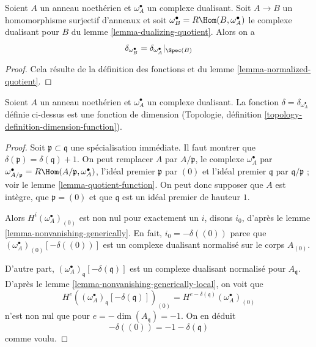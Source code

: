\begin{lemma}
\label{lemma-quotient-function}
Soient $A$ un anneau noethérien et $\omega_A^\bullet$ un complexe dualisant.
Soit $A \to B$ un homomorphisme surjectif d'anneaux et soit $\omega_B^\bullet = R\Hom(B, \omega_A^\bullet)$
le complexe dualisant pour $B$ du lemme \ref{lemma-dualizing-quotient}. Alors on a
$$
\delta_{\omega_B^\bullet} = \delta_{\omega_A^\bullet}|_{\Spec(B)}
$$
\end{lemma}

\begin{proof}
Cela résulte de la définition des fonctions et du lemme \ref{lemma-normalized-quotient}.
\end{proof}

\begin{lemma}
\label{lemma-dimension-function}
Soient $A$ un anneau noethérien et $\omega_A^\bullet$ un complexe dualisant.
La fonction $\delta = \delta_{\omega_A^\bullet}$ définie ci-dessus est une fonction de dimension
(Topologie, définition \ref{topology-definition-dimension-function}).
\end{lemma}

\begin{proof}
Soit $\mathfrak p \subset \mathfrak q$ une spécialisation immédiate. Il faut montrer que $\delta(\mathfrak p) = \delta(\mathfrak q) + 1$.
On peut remplacer $A$ par $A/\mathfrak p$, le complexe $\omega_A^\bullet$ par $\omega_{A/\mathfrak p}^\bullet = R\Hom(A/\mathfrak p, \omega_A^\bullet)$,
l'idéal premier $\mathfrak p$ par $(0)$ et l'idéal premier $\mathfrak q$ par $\mathfrak q/\mathfrak p$ ;
voir le lemme \ref{lemma-quotient-function}. On peut donc supposer que $A$ est intègre,
que $\mathfrak p = (0)$ et que $\mathfrak q$ est un idéal premier de hauteur $1$.

\medskip\noindent
Alors $H^i(\omega_A^\bullet)_{(0)}$ est non nul pour exactement un $i$,
disons $i_0$, d'après le lemme \ref{lemma-nonvanishing-generically}.
En fait, $i_0 = -\delta((0))$ parce que $(\omega_A^\bullet)_{(0)}[-\delta((0))]$ est un complexe dualisant normalisé
sur le corps $A_{(0)}$.

\medskip\noindent
D'autre part, $(\omega_A^\bullet)_\mathfrak q[-\delta(\mathfrak q)]$ est un complexe dualisant normalisé pour $A_\mathfrak q$.
D'après le lemme \ref{lemma-nonvanishing-generically-local}, on voit que
$$
H^e((\omega_A^\bullet)_\mathfrak q[-\delta(\mathfrak q)])_{(0)} =
H^{e - \delta(\mathfrak q)}(\omega_A^\bullet)_{(0)}
$$
n'est non nul que pour $e = -\dim(A_\mathfrak q) = -1$.
On en déduit
$$
-\delta((0)) = -1 - \delta(\mathfrak q)
$$
comme voulu.
\end{proof}

